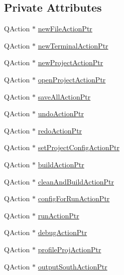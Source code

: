 \subsection*{Private Attributes}
\begin{DoxyCompactItemize}
\item 
Q\-Action $\ast$ \hyperlink{class_master_actions_a4da658e527460b8d5b0a263820259e97}{new\-File\-Action\-Ptr}
\item 
Q\-Action $\ast$ \hyperlink{class_master_actions_a6c3b1d9319fbf23f5a7cbe8305e16fc1}{new\-Terminal\-Action\-Ptr}
\item 
Q\-Action $\ast$ \hyperlink{class_master_actions_a114ab55c27fc183af68ebaaa86748a82}{new\-Project\-Action\-Ptr}
\item 
Q\-Action $\ast$ \hyperlink{class_master_actions_a3b4d98cdbfaa8e287d420513a8df53ee}{open\-Project\-Action\-Ptr}
\item 
Q\-Action $\ast$ \hyperlink{class_master_actions_a4e9bf6410023b508d56f235903a44b5f}{save\-All\-Action\-Ptr}
\item 
Q\-Action $\ast$ \hyperlink{class_master_actions_a23386959a2f60a89cc6ae1bff012c76c}{undo\-Action\-Ptr}
\item 
Q\-Action $\ast$ \hyperlink{class_master_actions_a7936a9bf0e7418cd864b2fb1ab786d09}{redo\-Action\-Ptr}
\item 
Q\-Action $\ast$ \hyperlink{class_master_actions_abe52f232f77f5a5bff35c8e3dadb3d80}{set\-Project\-Config\-Action\-Ptr}
\item 
Q\-Action $\ast$ \hyperlink{class_master_actions_a627d91b89d122dd27addc931d1c91ca0}{build\-Action\-Ptr}
\item 
Q\-Action $\ast$ \hyperlink{class_master_actions_a2c0f332975bec2424d4af212ab566c5a}{clean\-And\-Build\-Action\-Ptr}
\item 
Q\-Action $\ast$ \hyperlink{class_master_actions_acd6548d1110ae426f384bfeb6acc9c1f}{config\-For\-Run\-Action\-Ptr}
\item 
Q\-Action $\ast$ \hyperlink{class_master_actions_a3377fe0ddc45ce50119766c8a903c039}{run\-Action\-Ptr}
\item 
Q\-Action $\ast$ \hyperlink{class_master_actions_ae37993bbbed4a238ea3b11089ac46a61}{debug\-Action\-Ptr}
\item 
Q\-Action $\ast$ \hyperlink{class_master_actions_a5242e5fa69f4d15c15a32b43f227e397}{profile\-Proj\-Action\-Ptr}
\item 
Q\-Action $\ast$ \hyperlink{class_master_actions_a5b7a85c6728274eb0fcb48924044b9f6}{output\-South\-Action\-Ptr}

\end{DoxyCompactItemize}
